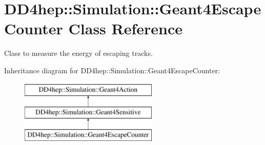 \hypertarget{class_d_d4hep_1_1_simulation_1_1_geant4_escape_counter}{}\section{D\+D4hep\+:\+:Simulation\+:\+:Geant4\+Escape\+Counter Class Reference}
\label{class_d_d4hep_1_1_simulation_1_1_geant4_escape_counter}


Class to measure the energy of escaping tracks.  


Inheritance diagram for D\+D4hep\+:\+:Simulation\+:\+:Geant4\+Escape\+Counter\+:\begin{figure}[H]
\begin{center}
\leavevmode
\includegraphics[height=3.000000cm]{class_d_d4hep_1_1_simulation_1_1_geant4_escape_counter}
\end{center}
\end{figure}
